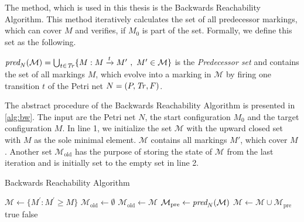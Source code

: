 \par
The method, which is used in this thesis is the Backwards Reachability Algorithm. This method iteratively calculates the set of all predecessor markings, which can cover $M$ and verifies, if $M_{0}$ is part of the set. Formally, we define this set as the following.
\begin{definition}\label{def:ppre}
$\operatorname{\textit{pred}}_{N}(\mathcal{M}) = \bigcup_{t \in \mathit{Tr}} \{M : M \xrightarrow{t} M' \ , \ M' \in \mathcal{M} \}$ is the \emph{Predecessor set} and contains the set of all markings $M$, which evolve into a marking in $\mathcal{M}$ by firing one transition $t$ of the Petri net $N = (P,\mathit{Tr},F)$.
\end{definition}
\par 
The abstract procedure of the Backwards Reachability Algorithm is presented in \autoref{alg:bw}. The input are the Petri net $N$, the start configuration $M_{0}$ and the target configuration $M$. In line 1, we initialize the set $\mathcal{M}$ with the upward closed set with $M$ as the sole minimal element. $\mathcal{M}$ contains all markings $M'$, which cover $M$. Another set $\mathcal{M}_{\text{old}}$ has the purpose of storing the state of $\mathcal{M}$ from the last iteration and is initially set to the empty set in line 2.

\begin{algorithm}[htb]
\caption{Backwards Reachability Algorithm}\label{alg:bw}
\begin{algorithmic}[1]
\State $\mathcal{M} \gets \{ M^{'} : M^{'} \ge M \}$
\State $\mathcal{M}_{\text{old}} \gets \emptyset$
	\State $\mathcal{M}_{\text{old}} \gets \mathcal{M}$
	\State $\mathcal{M}_{\text{pre}} \gets \operatorname{\textit{pred}}_{N}(\mathcal{M})$
	\State $\mathcal{M} \gets \mathcal{M}  \cup \mathcal{M}_{\text{pre}}$
	\Return true
\EndIf
{}
    \Return false
\EndIf
\EndWhile
\end{algorithmic}
\end{algorithm}

